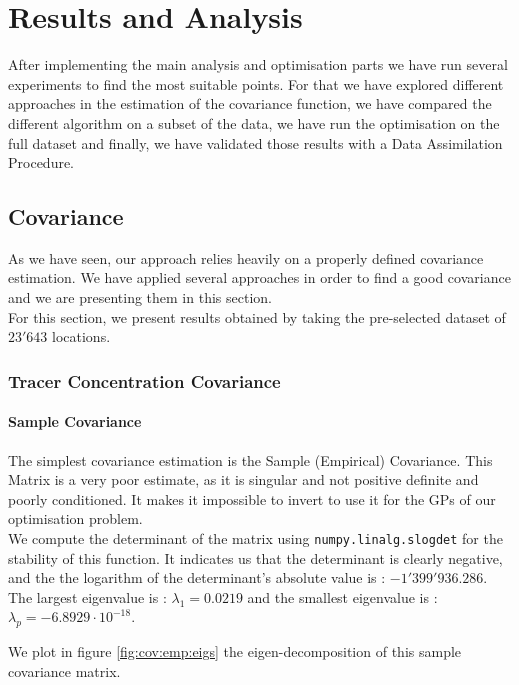 \chapter{Results and Analysis} \label{chap:results}


After implementing the main analysis and optimisation parts we have run several experiments to find the most suitable points. For that we have explored different approaches in the estimation of the covariance function, we have compared the different algorithm on a subset of the data, we have run the optimisation on the full dataset and finally, we have validated those results with a Data Assimilation Procedure. 


\section{Covariance}

As we have seen, our approach relies heavily on a properly defined covariance estimation. We have applied several approaches in order to find a good covariance and we are presenting them in this section. \\

For this section, we present results obtained by taking the pre-selected dataset of $23'643$ locations. 

\subsection{Tracer Concentration Covariance}
\subsubsection{Sample Covariance}

The simplest covariance estimation is the Sample (Empirical) Covariance. This Matrix is a very poor estimate, as it is singular and not positive definite and poorly conditioned. It makes it impossible to invert to use it for the GPs of our optimisation problem. \\ 

We compute the determinant of the matrix using \texttt{numpy.linalg.slogdet} for the stability of this function. It indicates us that the determinant is clearly negative, and the the logarithm of the determinant's absolute value is : $-1'399'936.286$. The largest eigenvalue is : $\lambda_1 = 0.0219$ and the smallest eigenvalue is : $\lambda_p = -6.8929 \cdot 10^{-18}$.

We plot in figure \ref{fig:cov:emp:eigs} the eigen-decomposition of this sample covariance matrix.

